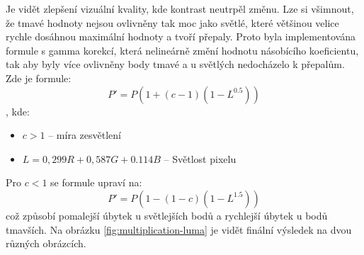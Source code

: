 \documentclass[11pt, a4paper, titlepage]{article}
\begin{document}
Je vidět zlepšení vizuální kvality, kde kontrast neutrpěl změnu.
Lze si všimnout, že tmavé hodnoty nejsou ovlivněny tak moc jako světlé, které většinou velice rychle dosáhnou maximální hodnoty a tvoří přepaly.
Proto byla implementována formule s gamma korekcí, která nelineárně změní hodnotu násobícího koeficientu, tak aby byly více ovlivněny body tmavé a u světlých nedocházelo k přepalům.
Zde je formule:
$$P' = P\left(1 + (c - 1)(1 - L^{0.5})\right)$$
, kde:
\begin{itemize}
    \item $c > 1$ -- míra zesvětlení
    \item $L = 0,299R + 0,587G + 0.114B$ -- Světlost pixelu
\end{itemize}
Pro $c < 1$ se formule upraví na:
$$P' = P\left(1 - (1 - c)(1 - L^{1.5})\right)$$
což způsobí pomalejší úbytek  u světlejších bodů a rychlejší úbytek u bodů tmavších.
Na obrázku \ref{fig:multiplication-luma} je vidět finální výsledek na dvou různých obrázcích.
\end{document}
